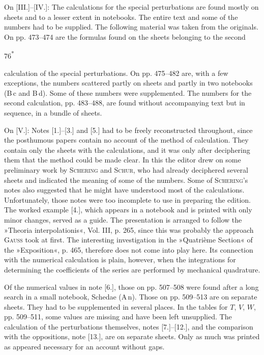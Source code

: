 \begingroup
{}
\renewcommand{\headrulewidth}{0pt}
\par\noindent\hspace*{\parindent}On [III.]--[IV.]: The calculations for the special perturbations are found
mostly on sheets and to a lesser extent in notebooks. The entire text
and some of the numbers had to be supplied. The following material was taken from the originals.
On pp. 473--474 are the formulas found on the sheets belonging to the second
\par\smallskip\noindent\hfill 76\textsuperscript{*}\par
\noindent{}calculation of the special perturbations.
On pp. 475--482 are, with a few exceptions, the numbers scattered partly on sheets and partly in
two notebooks (B\,c and B\,d). Some of these numbers were supplemented.
The numbers for the second calculation, pp. 483--488, are found without accompanying text
but in sequence, in a bundle of sheets.

\par\noindent\hspace*{\parindent}On [V.]: Notes [1.]--[3.] and [5.] had to be freely reconstructed throughout,
since the posthumous papers contain no account of the method of calculation.
They contain only the sheets with the calculations, and it was only after deciphering them that
the method could be made clear. In this the editor drew on
some preliminary work by \textsc{Schering} and \textsc{Schur}, who had already deciphered several sheets
and indicated the meaning of some of the numbers. Some of
\textsc{Schering}'s notes also suggested that he might have
understood most of the calculations. Unfortunately, those
notes were too incomplete to use in preparing the edition.
The worked example [4.], which appears in a notebook and is printed with only minor
changes, served as a guide. The presentation is arranged
to follow the »Theoria interpolationis«, Vol. III, p. 265, since
this was probably the approach \textsc{Gauss} took at first.
The interesting investigation in the »Quatrième Section« of the »Exposition«, p. 465,
therefore does not come into play here. Its connection with the numerical
calculation is plain, however, when the integrations for determining the
coefficients of the series are performed by mechanical quadrature.

\par\noindent\hspace*{\parindent}Of the numerical values in note [6.], those on pp. 507--508
were found after a long search in a small notebook, Schedae (A\,n). Those on pp. 509--513
are on separate sheets. They had to be supplemented in several places. In the tables
for \(T\), \(V\), \(W\), pp. 509--511, some values are missing and have been left unsupplied.
The calculation of the perturbations themselves, notes [7.]--[12.], and the comparison with
the oppositions, note [13.], are on separate sheets. Only as much was
printed as appeared necessary for an account without gaps.

